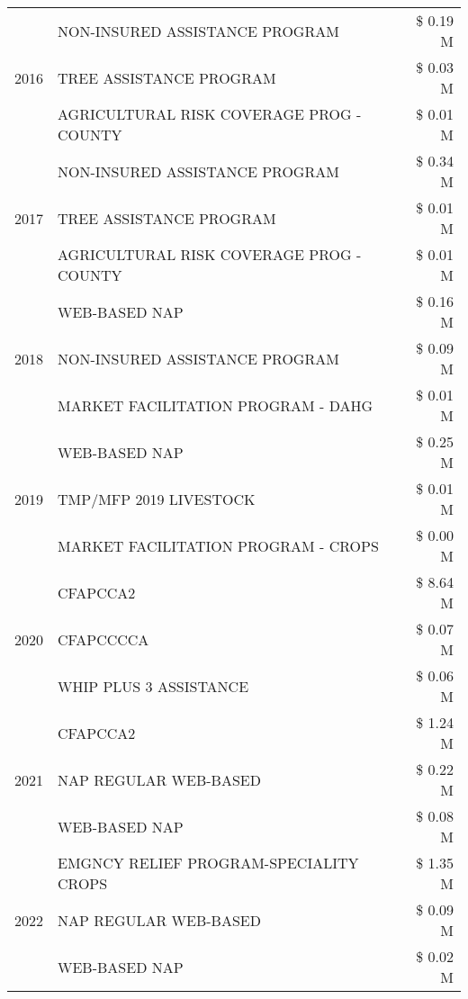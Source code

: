 \begin{tabular}{llr}
\cline{1-3}
\multirow[t]{3}{*}{2016} & NON-INSURED ASSISTANCE PROGRAM & \$ 0.19 M \\
 & TREE ASSISTANCE PROGRAM & \$ 0.03 M \\
 & AGRICULTURAL RISK COVERAGE PROG - COUNTY & \$ 0.01 M \\
\cline{1-3}
\multirow[t]{3}{*}{2017} & NON-INSURED ASSISTANCE PROGRAM & \$ 0.34 M \\
 & TREE ASSISTANCE PROGRAM & \$ 0.01 M \\
 & AGRICULTURAL RISK COVERAGE PROG - COUNTY & \$ 0.01 M \\
\cline{1-3}
\multirow[t]{3}{*}{2018} & WEB-BASED NAP & \$ 0.16 M \\
 & NON-INSURED ASSISTANCE PROGRAM & \$ 0.09 M \\
 & MARKET FACILITATION PROGRAM - DAHG & \$ 0.01 M \\
\cline{1-3}
\multirow[t]{3}{*}{2019} & WEB-BASED NAP & \$ 0.25 M \\
 & TMP/MFP 2019 LIVESTOCK & \$ 0.01 M \\
 & MARKET FACILITATION PROGRAM - CROPS & \$ 0.00 M \\
\cline{1-3}
\multirow[t]{3}{*}{2020} & CFAPCCA2 & \$ 8.64 M \\
 & CFAPCCCCA & \$ 0.07 M \\
 & WHIP PLUS 3 ASSISTANCE & \$ 0.06 M \\
\cline{1-3}
\multirow[t]{3}{*}{2021} & CFAPCCA2 & \$ 1.24 M \\
 & NAP REGULAR WEB-BASED & \$ 0.22 M \\
 & WEB-BASED NAP & \$ 0.08 M \\
\cline{1-3}
\multirow[t]{3}{*}{2022} & EMGNCY RELIEF PROGRAM-SPECIALITY CROPS & \$ 1.35 M \\
 & NAP REGULAR WEB-BASED & \$ 0.09 M \\
 & WEB-BASED NAP & \$ 0.02 M \\
\cline{1-3}
\bottomrule
\end{tabular}
